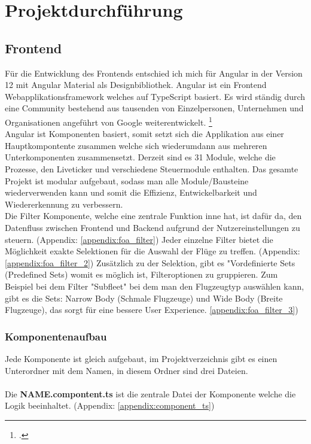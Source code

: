 \section{Projektdurchführung}

	\subsection{Frontend}
	Für die Entwicklung des Frontends entschied ich mich für Angular in der Version 12 mit Angular Material als Designbibliothek. Angular ist ein Frontend Webapplikationsframework welches auf TypeScript basiert. Es wird ständig durch eine Community bestehend aus tausenden von Einzelpersonen, Unternehmen und Organisationen angeführt von Google weiterentwickelt. \footcite{3}\\
	Angular ist Komponenten basiert, somit setzt sich die Applikation aus einer Hauptkompontente zusammen welche sich wiederumdann aus mehreren Unterkomponenten zusammensetzt. Derzeit sind es 31 Module, welche die Prozesse, den Liveticker und verschiedene Steuermodule enthalten. Das gesamte Projekt ist modular aufgebaut, sodass man alle Module/Bausteine wiederverwenden kann und somit die Effizienz, Entwickelbarkeit und Wiedererkennung zu verbessern.\\
	Die Filter Komponente, welche eine zentrale Funktion inne hat, ist dafür da, den Datenfluss zwischen Frontend und Backend aufgrund der Nutzereinstellungen zu steuern. (Appendix: \ref{appendix:foa_filter}) Jeder einzelne Filter bietet die Möglichkeit exakte Selektionen für die Auswahl der Flüge zu treffen. (Appendix: \ref{appendix:foa_filter_2}) Zusätzlich zu der Selektion, gibt es "Vordefinierte Sets (Predefined Sets) womit es möglich ist, Filteroptionen zu gruppieren. Zum Beispiel bei dem Filter "Subfleet" bei dem man den Flugzeugtyp auswählen kann, gibt es die Sets: Narrow Body (Schmale Flugzeuge) und Wide Body (Breite Flugzeuge), das sorgt für eine bessere User Experience. \ref{appendix:foa_filter_3})

	\subsubsection{Komponentenaufbau}
	Jede Komponente ist gleich aufgebaut, im Projektverzeichnis gibt es einen Unterordner mit dem Namen, in diesem Ordner sind drei Dateien.\\
	\\Die \textbf{NAME.compontent.ts} ist die zentrale Datei der Komponente welche die Logik beeinhaltet. (Appendix: \ref{appendix:component_ts})\\

